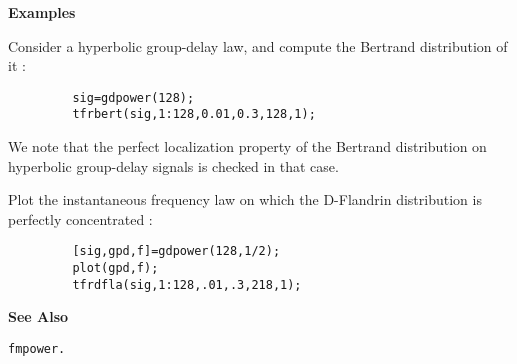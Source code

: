 {\bf \large \sf Examples}\\
\hspace*{1.5cm}
\begin{minipage}[t]{13.5cm}
Consider a hyperbolic group-delay law, and compute the Bertrand
distribution of it :
\begin{verbatim}
         sig=gdpower(128); 
         tfrbert(sig,1:128,0.01,0.3,128,1);
\end{verbatim}
We note that the perfect localization property of the Bertrand distribution
on hyperbolic group-delay signals is checked in that case. \\
\end{minipage}
\newpage
\hspace*{1.5cm}\begin{minipage}[t]{13.5cm}
Plot the instantaneous frequency law on which the D-Flandrin distribution
is perfectly concentrated :
\begin{verbatim}
         [sig,gpd,f]=gdpower(128,1/2); 
         plot(gpd,f); 
         tfrdfla(sig,1:128,.01,.3,218,1);
\end{verbatim}
\end{minipage}
\vspace*{.5cm}


{\bf \large \sf See Also}\\
\hspace*{1.5cm}
\begin{minipage}[t]{13.5cm}
\begin{verbatim}
fmpower.
\end{verbatim}
\end{minipage}

